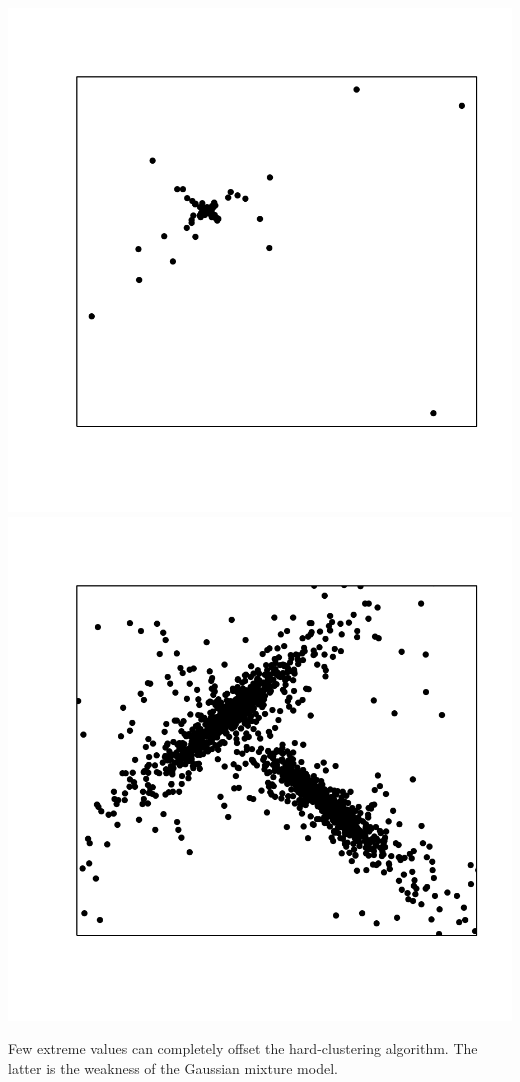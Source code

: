 \documentclass[landscape,footrule]{foils}
\begin{document}

\centerline{\includegraphics[scale=0.8]{hard-gmm-failure-1}\hspace*{-1.7cm}\includegraphics[scale=0.8]{hard-gmm-failure-2}}
\vspace*{-1cm}

Few extreme values can completely offset the hard-clustering algorithm. The latter is the weakness of the Gaussian mixture model.\vspace*{-0.5cm}
\end{document}
